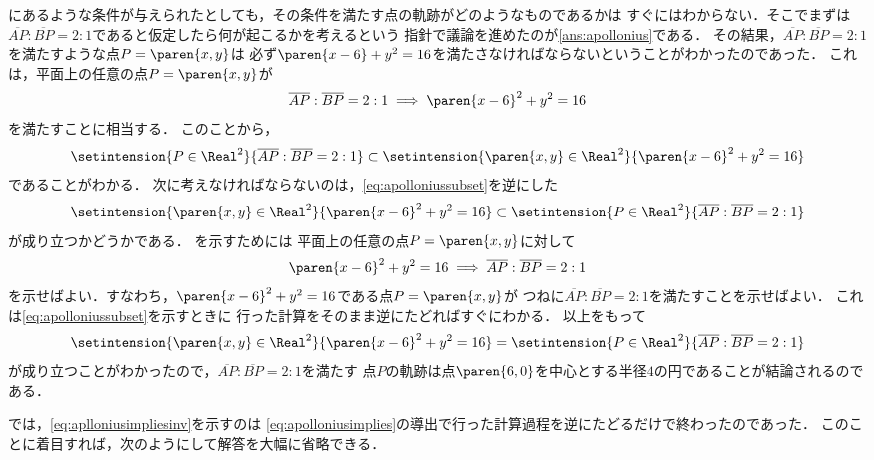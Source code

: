 \documentclass[11pt,a4paper]{ltjsarticle}
\newcommand*{\length}[1]{\overline{#1}}
\newcommand*{\coord}[1]{\paren{#1}}
\theoremstyle{definition}
\begin{document}
にあるような条件が与えられたとしても，その条件を満たす点の軌跡がどのようなものであるかは
すぐにはわからない．そこでまずは$\length{AP} : \length{BP} = 2 : 1$であると仮定したら何が起こるかを考えるという
指針で議論を進めたのが\cref{ans:apollonius}である．
その結果，$\length{AP} : \length{BP} = 2 : 1$を満たすような点$P = \coord{x,y}$は
必ず$\paren{x - 6} + y^2 = 16$を満たさなければならないということがわかったのであった．
これは，平面上の任意の点$P = \coord{x,y}$が
\begin{align}
  \length{AP} : \length{BP} = 2 : 1 \implies \paren{x - 6}^2 + y^2 = 16
  \label{eq:apolloniusimplies}
\end{align}
を満たすことに相当する．
このことから，
\begin{align}
  \setintension{P \in \Real ^2}{\length{AP} : \length{BP} = 2 : 1} \subset
  \setintension{\coord{x,y} \in \Real^2}{\paren{x - 6}^2 + y^2 = 16}
  \label{eq:apolloniussubset}
\end{align}
であることがわかる．
次に考えなければならないのは，\cref{eq:apolloniussubset}を逆にした
\begin{align}
  \setintension{\coord{x,y} \in \Real^2}{\paren{x - 6}^2 + y^2 = 16} \subset
  \setintension{P \in \Real ^2}{\length{AP} : \length{BP} = 2 : 1}
  \label{eq:apolloniussubsetinv}
\end{align}
が成り立つかどうかである．
を示すためには
平面上の任意の点$P = \coord{x,y}$に対して
\begin{align}
  \paren{x - 6}^2 + y^2 = 16 \implies \length{AP} : \length{BP} = 2 : 1
  \label{eq:aplloniusimpliesinv}
\end{align}
を示せばよい．すなわち，$\paren{x - 6}^2 + y^2 = 16$である点$P = \coord{x, y}$が
つねに$\length{AP} : \length{BP} = 2 : 1$を満たすことを示せばよい．
これは\cref{eq:apolloniussubset}を示すときに
行った計算をそのまま逆にたどればすぐにわかる．
以上をもって
\begin{align}
  \setintension{\coord{x,y} \in \Real^2}{\paren{x - 6}^2 + y^2 = 16} =
  \setintension{P \in \Real ^2}{\length{AP} : \length{BP} = 2 : 1}
  \label{eq:apolloniusequal}
\end{align}
が成り立つことがわかったので，$\length{AP} : \length{BP} = 2 : 1$を満たす
点$P$の軌跡は点$\coord{6, 0}$を中心とする半径$4$の円であることが結論されるのである．


では，\cref{eq:aplloniusimpliesinv}を示すのは
\cref{eq:apolloniusimplies}の導出で行った計算過程を逆にたどるだけで終わったのであった．
このことに着目すれば，次のようにして解答を大幅に省略できる．
\end{document}
